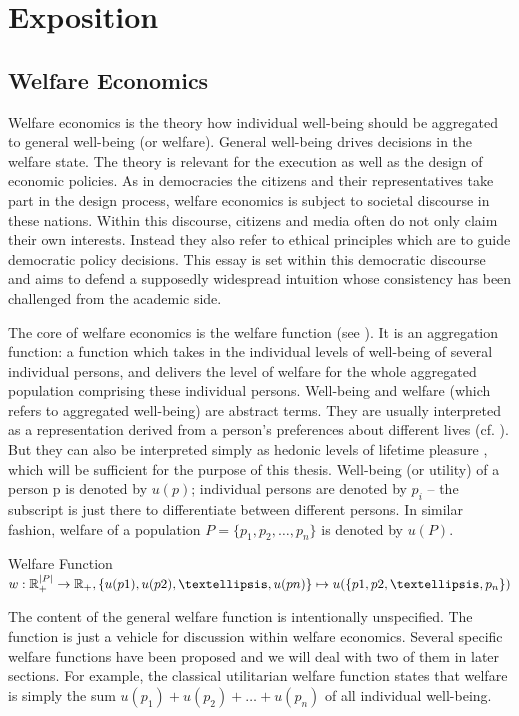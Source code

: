 \chapter{Exposition}
\section{Welfare Economics}

Welfare economics is the theory how individual well-being should be aggregated to general well-being (or welfare). General well-being drives decisions in the welfare state. The theory is relevant for the execution as well as the design of economic policies. As in democracies the citizens and their representatives take part in the design process, welfare economics is subject to societal discourse in these nations. Within this discourse, citizens and media often do not only claim their own interests. Instead they also refer to ethical principles which are to guide democratic policy decisions. This essay is set within this democratic discourse and aims to defend a supposedly widespread intuition whose consistency has been challenged from the academic side.  

The core of welfare economics is the welfare function (see ). It is an aggregation function: a function which takes in the individual levels of well-being of several individual persons, and delivers the level of welfare for the whole aggregated population comprising these individual persons. Well-being and welfare (which refers to aggregated well-being) are abstract terms. They are usually interpreted as a representation derived from a person's preferences about different lives (cf. ). But they can also be interpreted simply as hedonic levels of lifetime pleasure \cite[ch.~4.1]{crisp_2017}, which will be sufficient for the purpose of this thesis. Well-being (or utility) of a person p is denoted by $u(p)$; individual persons are denoted by $p_i$ – the subscript is just there to differentiate between different persons. In similar fashion, welfare of a population $P = \{ p_1, p_2, …, p_n \}$ is denoted by $u(P)$. 

\begin{Definition}{Welfare Function}{}
$
  w: \hfill
  \mathbb{R}_+^{|P|} \to \mathbb{R}_+, \hfill
  \{ u(p1), u(p2), …, u(pn) \} \mapsto u( \{ p1, p2, …, p_n \} ) 
$
\end{Definition}

The content of the general welfare function is intentionally unspecified. The function is just a vehicle for discussion within welfare economics. Several specific welfare functions have been proposed and we will deal with two of them in later sections. For example, the classical utilitarian welfare function states that welfare is simply the sum $u(p_1) + u(p_2) + … + u(p_n)$ of all individual well-being.  


